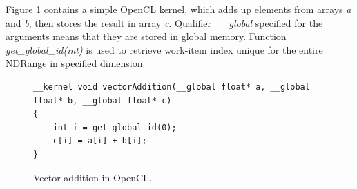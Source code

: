 \documentclass
[
    digital, %
    oneside, %
    table, %
    nolof, %
    nolot, %
    nocover %
]{fithesis3}
\begin{document}
Figure \ref{vector_addition} contains a simple OpenCL kernel, which adds up elements from arrays \textit{a} and \textit{b}, then stores the result in
array \textit{c}. Qualifier \textit{\_\_global} specified for the arguments means that they are stored in global memory. Function
\textit{get\_global\_id(int)} is used to retrieve work-item index unique for the entire NDRange in specified dimension.
\begin{figure}
\begin{lstlisting}
__kernel void vectorAddition(__global float* a, __global float* b, __global float* c)
{
    int i = get_global_id(0);
    c[i] = a[i] + b[i];
}
\end{lstlisting}
\caption{Vector addition in OpenCL.}
\label{vector_addition}
\end{figure}
\end{document}
